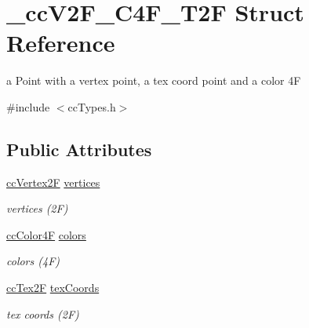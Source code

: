 \hypertarget{struct__cc_v2_f___c4_f___t2_f}{\section{\-\_\-cc\-V2\-F\-\_\-\-C4\-F\-\_\-\-T2\-F Struct Reference}
\label{struct__cc_v2_f___c4_f___t2_f}
}


a Point with a vertex point, a tex coord point and a color 4\-F  




{\ttfamily \#include $<$cc\-Types.\-h$>$}

\subsection*{Public Attributes}
\begin{DoxyCompactItemize}
\item 
\hypertarget{struct__cc_v2_f___c4_f___t2_f_ab64544ff15116aa4fd1d0ec38a4a5bfe}{\hyperlink{cc_types_8h_a3d0a9a02a1f9787a9ede91b9a74bf41f}{cc\-Vertex2\-F} \hyperlink{struct__cc_v2_f___c4_f___t2_f_ab64544ff15116aa4fd1d0ec38a4a5bfe}{vertices}}\label{struct__cc_v2_f___c4_f___t2_f_ab64544ff15116aa4fd1d0ec38a4a5bfe}

\begin{DoxyCompactList}\small\item\em vertices (2\-F) \end{DoxyCompactList}\item 
\hypertarget{struct__cc_v2_f___c4_f___t2_f_a37d7299c07d14527b6c2ea2b5f9d8a59}{\hyperlink{cc_types_8h_aecc18290defe020343f1d7bb2ee73145}{cc\-Color4\-F} \hyperlink{struct__cc_v2_f___c4_f___t2_f_a37d7299c07d14527b6c2ea2b5f9d8a59}{colors}}\label{struct__cc_v2_f___c4_f___t2_f_a37d7299c07d14527b6c2ea2b5f9d8a59}

\begin{DoxyCompactList}\small\item\em colors (4\-F) \end{DoxyCompactList}\item 
\hypertarget{struct__cc_v2_f___c4_f___t2_f_a712e47b9982f6b9728f080c272d8dae1}{\hyperlink{cc_types_8h_a95226f1345c203215cc1f419aafe47c5}{cc\-Tex2\-F} \hyperlink{struct__cc_v2_f___c4_f___t2_f_a712e47b9982f6b9728f080c272d8dae1}{tex\-Coords}}\label{struct__cc_v2_f___c4_f___t2_f_a712e47b9982f6b9728f080c272d8dae1}

\begin{DoxyCompactList}\small\item\em tex coords (2\-F) \end{DoxyCompactList}\end{DoxyCompactItemize}


